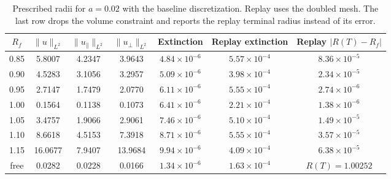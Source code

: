 \begin{table}[tbp]
\caption{Prescribed radii for $a=0.02$ with the baseline discretization. Replay uses the doubled mesh. The last row drops the volume constraint and reports the replay terminal radius instead of its error.}
\label{tab:num_targets}
\centering\footnotesize\setlength{\tabcolsep}{4pt}
\begin{tabular}{ccccccc}
\toprule
$R_f$ & $\|u\|_{L^2}$ & $\|u_\parallel\|_{L^2}$ & $\|u_\perp\|_{L^2}$ & Extinction & Replay extinction & Replay $|R(T)-R_f|$\\
\midrule
0.85 & 5.8007 & 4.2347 & 3.9643 & $4.84\times10^{-6}$ & $5.57\times10^{-4}$ & $8.36\times10^{-5}$ \\
0.90 & 4.5283 & 3.1056 & 3.2957 & $5.09\times10^{-6}$ & $3.98\times10^{-4}$ & $2.34\times10^{-5}$ \\
0.95 & 2.7147 & 1.7479 & 2.0770 & $6.11\times10^{-6}$ & $5.55\times10^{-4}$ & $2.74\times10^{-6}$ \\
1.00 & 0.1564 & 0.1138 & 0.1073 & $6.41\times10^{-6}$ & $2.21\times10^{-4}$ & $1.38\times10^{-6}$ \\
1.05 & 3.4757 & 1.9066 & 2.9061 & $7.46\times10^{-6}$ & $5.10\times10^{-4}$ & $1.49\times10^{-5}$ \\
1.10 & 8.6618 & 4.5153 & 7.3918 & $8.71\times10^{-6}$ & $5.55\times10^{-4}$ & $3.57\times10^{-5}$ \\
1.15 & 16.0677 & 7.9407 & 13.9684 & $9.94\times10^{-6}$ & $4.09\times10^{-4}$ & $6.38\times10^{-5}$ \\
free & 0.0282 & 0.0228 & 0.0166 & $1.34\times10^{-6}$ & $1.63\times10^{-4}$ & \(R(T)=1.00252\) \\
\bottomrule
\end{tabular}
\end{table}
